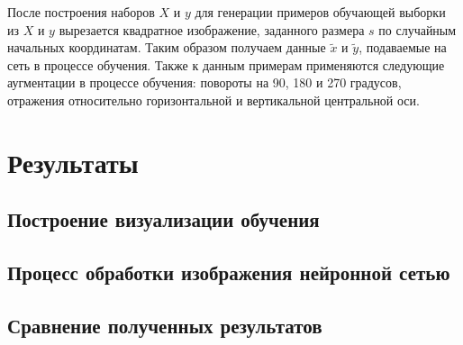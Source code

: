 После построения наборов $X$ и $y$ для генерации примеров обучающей выборки из $X$ и $y$ вырезается квадратное изображение, заданного размера $s$ по случайным начальных координатам. Таким образом получаем данные $\tilde{x}$ и $\tilde{y}$, подаваемые на сеть в процессе обучения. Также к данным примерам применяются следующие аугментации в процессе обучения: повороты на 90, 180 и 270 градусов, отражения относительно горизонтальной и вертикальной центральной оси.


\chapter{Результаты}
\section{Построение визуализации обучения}
\section{Процесс обработки изображения нейронной сетью}
\section{Сравнение полученных результатов}


\Conc

